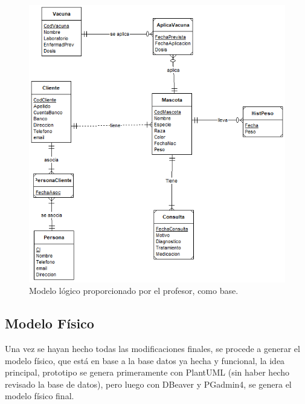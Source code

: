 \documentclass[
  12pt,
  hidelinks,
  a4paper,
  headings=standardclasses,
  headings=big,
  spanish
]{scrartcl}
\begin{document}
\begin{figure}[H]
  \centering
  \includegraphics[width=\textwidth]{0-base.png}
  \caption{Modelo lógico proporcionado por el profesor, como base.}
\end{figure}

\pagebreak
\subsection{Modelo Físico}
Una vez se hayan hecho todas las modificaciones finales, se procede a generar el modelo físico, que está en base a la base datos ya hecha y funcional, la idea principal, prototipo se genera primeramente con PlantUML (sin haber hecho revisado la base de datos), pero luego con DBeaver y PGadmin4, se genera el modelo físico final.
\end{document}
